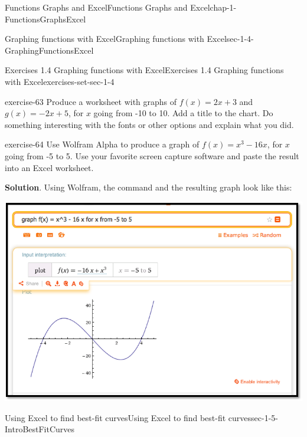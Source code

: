 \documentclass[oneside,10pt,]{book}
\numberwithin{equation}{section}
\begin{document}
\begin{chapterptx}{Functions Graphs and Excel}{}{Functions Graphs and Excel}{}{}{chap-1-FunctionsGraphsExcel}
\begin{sectionptx}{Graphing functions with Excel}{}{Graphing functions with Excel}{}{}{sec-1-4-GraphingFunctionsExcel}
\begin{exercises-subsection-numberless}{Exercises 1.4 Graphing functions with Excel}{}{Exercises 1.4 Graphing functions with Excel}{}{}{exercises-set-sec-1-4}
\begin{divisionexercise}{10}{}{}{exercise-63}%
\hypertarget{p-357}{}%
Produce a worksheet with graphs of \(f(x) = 2 x + 3\) and \(g(x) = -2 x +5\), for \(x\) going from -10 to 10.  Add a title to the chart.  Do something interesting with the fonts or other options and explain what you did.%
\end{divisionexercise}%
\begin{divisionexercise}{11}{}{}{exercise-64}%
\hypertarget{p-358}{}%
Use Wolfram Alpha to produce a graph of \(f(x) = x^3 - 16 x\), for \(x\) going from -5 to 5.  Use your favorite screen capture software and paste the result into an Excel worksheet.%
\par\smallskip%
\noindent\textbf{Solution}.\hypertarget{solution-31}{}\quad%
\hypertarget{p-359}{}%
Using Wolfram, the command and the resulting graph look like this:%
\begin{sidebyside}{1}{0}{0}{0}%
\begin{sbspanel}{1}%
\includegraphics[width=1\linewidth]{images/sec1-4-sol11a.png}
\end{sbspanel}%
\end{sidebyside}%
\end{divisionexercise}%
\end{exercises-subsection-numberless}
\end{sectionptx}
%
%
\typeout{************************************************}
\typeout{************************************************}
%
\begin{sectionptx}{Using Excel to find best-fit curves}{}{Using Excel to find best-fit curves}{}{}{sec-1-5-IntroBestFitCurves}
\hypertarget{p-360}{}%

\end{sectionptx}
\end{chapterptx}
\end{document}
